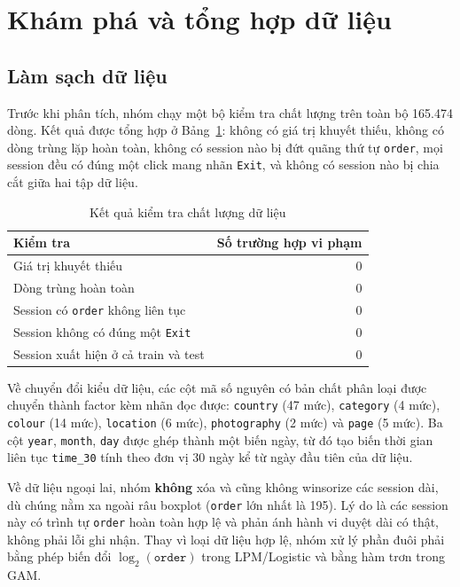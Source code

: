 
\section{Khám phá và tổng hợp dữ liệu}

\subsection{Làm sạch dữ liệu}

Trước khi phân tích, nhóm chạy một bộ kiểm tra chất lượng trên toàn bộ 165.474
dòng. Kết quả được tổng hợp ở Bảng~\ref{tab:quality}: không có giá trị khuyết
thiếu, không có dòng trùng lặp hoàn toàn, không có session nào bị đứt quãng thứ
tự \texttt{order}, mọi session đều có đúng một click mang nhãn \texttt{Exit}, và
không có session nào bị chia cắt giữa hai tập dữ liệu.

\begin{table}[H]
\centering
\caption{Kết quả kiểm tra chất lượng dữ liệu}
\label{tab:quality}
\begin{tabular}{lr}
\toprule
\textbf{Kiểm tra} & \textbf{Số trường hợp vi phạm} \\
\midrule
Giá trị khuyết thiếu                 & 0 \\
Dòng trùng hoàn toàn                 & 0 \\
Session có \texttt{order} không liên tục & 0 \\
Session không có đúng một \texttt{Exit}  & 0 \\
Session xuất hiện ở cả train và test     & 0 \\
\bottomrule
\end{tabular}
\end{table}

Về chuyển đổi kiểu dữ liệu, các cột mã số nguyên có bản chất phân loại được
chuyển thành factor kèm nhãn đọc được: \texttt{country} (47 mức),
\texttt{category} (4 mức), \texttt{colour} (14 mức), \texttt{location} (6 mức),
\texttt{photography} (2 mức) và \texttt{page} (5 mức). Ba cột
\texttt{year}, \texttt{month}, \texttt{day} được ghép thành một biến ngày, từ đó
tạo biến thời gian liên tục \texttt{time\_30} tính theo đơn vị 30 ngày kể từ ngày
đầu tiên của dữ liệu.

Về dữ liệu ngoại lai, nhóm \textbf{không} xóa và cũng không winsorize các session
dài, dù chúng nằm xa ngoài râu boxplot (\texttt{order} lớn nhất là 195). Lý do là
các session này có trình tự \texttt{order} hoàn toàn hợp lệ và phản ánh hành vi
duyệt dài có thật, không phải lỗi ghi nhận. Thay vì loại dữ liệu hợp lệ, nhóm xử
lý phần đuôi phải bằng phép biến đổi $\log_2(\texttt{order})$ trong LPM/Logistic
và bằng hàm trơn trong GAM.

